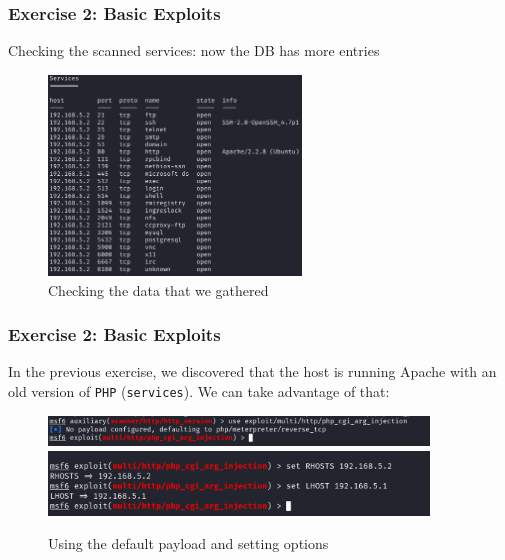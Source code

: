 \documentclass[handout]{beamer}
\begin{document}
\begin{frame}
	\frametitle{Exercise 2: Basic Exploits}
	Checking the scanned services: now the DB has more entries
	\begin{figure}
	    \centering
	    \includegraphics[width=0.6\textwidth]{../drawable/exercise_2_screenshots/services_full_v2.png}
	    \caption{Checking the data that we gathered}
	\end{figure}
\end{frame}


\begin{frame}
	\frametitle{Exercise 2: Basic Exploits}
	In the previous exercise, we discovered that the host is running Apache with an old version of \texttt{PHP} (\texttt{services}). We can take advantage of that:
	\begin{figure}
	    \centering
	    \includegraphics[width=0.9\textwidth]{../drawable/exercise_2_screenshots/use_exploit_cgi_exception.png}
	    \includegraphics[width=0.9\textwidth]{../drawable/exercise_2_screenshots/set_exploit_options.png}
	    \caption{Using the default payload and setting options}
	\end{figure}
\end{frame}
\end{document}
